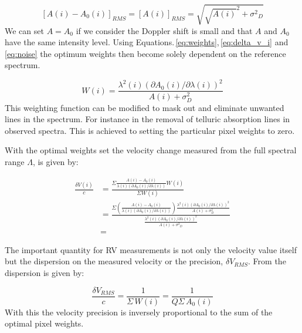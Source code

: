 \begin{equation}
{[{A(i)-A_0(i)}]}_{RMS} = {[{A(i)}]}_{RMS} = \sqrt{{\sqrt{A(i)}}^{2} + {\sigma^{2}}_{D}} \label{eq:noise}
\end{equation}
We can set \(A = A_0\) if we consider the Doppler shift is small and that \(A\) and \(A_0\) have the same intensity level. Using Equations.\,\ref{eq:weights},\,\ref{eq:delta_v_i} and\,\ref{eq:noise} the optimum weights then become solely dependent on the reference spectrum.



\begin{equation}
W(i) = \frac{{\lambda}^{2}(i) {({\partial A_0(i)}/{\partial \lambda(i)})}^{2}}{A(i) + {\sigma}^{2}_{D}} \label{eq:optimal_weight}
\end{equation}
This weighting function can be modified to mask out and eliminate unwanted lines in the spectrum. For instance in the removal of telluric absorption lines in observed spectra. This is achieved to setting the particular pixel weights to zero.

With the optimal weights set the velocity change measured from the full spectral range \(\Lambda\),  is given by:


\begin{eqnarray}
    \frac{\delta V(i)}{c} &= \frac{
        \Sigma{
            \frac{
                A(i) - A_0(i)}{
                \lambda(i) \left({\partial A_0(i)}/{\partial \lambda(i)}\right)} W(i)}}{
             \Sigma {W(i)}} \\
    &= \frac{
        \Sigma  {
            (\frac
                {A(i) - A_0(i)}
                {\lambda(i) (\partial A_0(i)/\partial \lambda(i))}) \frac
                    {\lambda^{2}(i) {({\partial A_0(i)}/{\partial \lambda(i)})}^{2}}
                    {A(i) + {\sigma}^{2}_{D}}
                 }
         }
    {\frac
        {\lambda^{2}(i) {({\partial A_0(i)}/{\partial \lambda(i)})}^{2}}{A(i) + {{\sigma}^{2}}_{D}}
        } \\
    &=
    \label{eq:delta_v_eqarray}
\end{eqnarray}

The important quantity for {RV} measurements is not only the velocity value itself but the dispersion on the measured velocity or the precision, \(\delta V_{RMS}\). From  the dispersion is given by:


\begin{equation}
    \frac{\delta V_{RMS}}{c} = \frac{1}{\Sigma {\,W(i)}} = \frac{1}{Q \Sigma {\,A_0(i)}} \label{eq:dv_rms}
\end{equation}
With this the velocity precision is inversely proportional to the sum of the optimal pixel weights.

